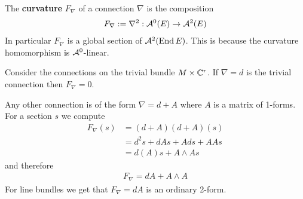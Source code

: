 \begin{definition}
    The \textbf{curvature} $F_\nabla$ of a connection $\nabla$ is the composition \begin{align*}
        F_\nabla := \nabla^2:{\mathcal{A}}^0(E)\to{\mathcal{A}}^2(E)
    \end{align*} In particular $F_\nabla$ is a global section of ${\mathcal{A}}^2(\operatorname{End} E)$. This is because 
    the curvature homomorphism is ${\mathcal{A}}^0$-linear.
\end{definition}

\begin{example}
    Consider the connections on the trivial bundle $M\times \mathbb{C}^r$. If $\nabla = d$ is the
    trivial connection then $F_\nabla = 0$. 

    Any other connection is of the form $\nabla = d + A$ where $A$ is a matrix of 1-forms. For a section
    $s$ we compute \begin{align*}
        F_\nabla(s) &= (d+A)(d+A)(s) \\
        &= d^2s + dAs + Ads + AAs \\
        &= d(A)s + A\wedge As
    \end{align*} and therefore \begin{align*}
        F_\nabla = dA + A\wedge A
    \end{align*}
    For line bundles we get that $F_\nabla = dA$ is an ordinary 2-form.
\end{example}
